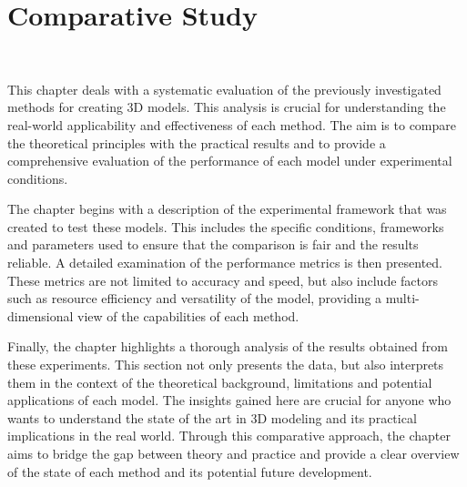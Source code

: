 \chapter{Comparative Study}~\label{ch:comparative study}

This chapter deals with a systematic evaluation of the previously investigated methods for creating 3D models. This analysis is crucial for understanding the real-world applicability and effectiveness of each method. The aim is to compare the theoretical principles with the practical results and to provide a comprehensive evaluation of the performance of each model under experimental conditions.

The chapter begins with a description of the experimental framework that was created to test these models. This includes the specific conditions, frameworks and parameters used to ensure that the comparison is fair and the results reliable. A detailed examination of the performance metrics is then presented. These metrics are not limited to accuracy and speed, but also include factors such as resource efficiency and versatility of the model, providing a multi-dimensional view of the capabilities of each method.

Finally, the chapter highlights a thorough analysis of the results obtained from these experiments. This section not only presents the data, but also interprets them in the context of the theoretical background, limitations and potential applications of each model. The insights gained here are crucial for anyone who wants to understand the state of the art in 3D modeling and its practical implications in the real world. Through this comparative approach, the chapter aims to bridge the gap between theory and practice and provide a clear overview of the state of each method and its potential future development.




